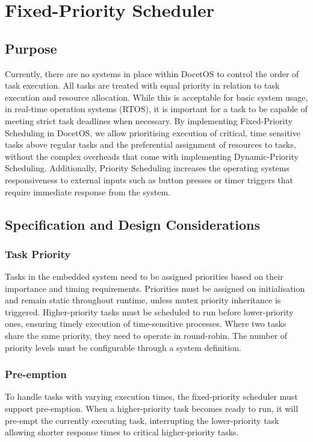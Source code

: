 \section{Fixed-Priority Scheduler}
\subsection{Purpose}
Currently, there are no systems in place within DocetOS to control the order of task execution. All tasks are treated with equal priority in relation to task execution and resource allocation. While this is acceptable for basic system usage, in real-time operation systems (RTOS), it is important for a task to be capable of meeting strict task deadlines when necessary.\hfill\newline
By implementing Fixed-Priority Scheduling in DocetOS, we allow prioritising execution of critical, time sensitive tasks above regular tasks and the preferential assignment of resources to tasks, without the complex overheads that come with implementing Dynamic-Priority Scheduling. Additionally, Priority Scheduling increases the operating systems responsiveness to external inputs such as button presses or timer triggers that require immediate response from the system.

\subsection{Specification and Design Considerations}
\subsubsection{Task Priority}
Tasks in the embedded system need to be assigned priorities based on their importance and timing requirements. Priorities must be assigned on initialisation and remain static throughout runtime, unless mutex priority inheritance is triggered. Higher-priority tasks must be scheduled to run before lower-priority ones, ensuring timely execution of time-sensitive processes. Where two tasks share the same priority, they need to operate in round-robin. The number of priority levels must be configurable through a system definition.

\subsubsection{Pre-emption}
To handle tasks with varying execution times, the fixed-priority scheduler must support pre-emption. When a higher-priority task becomes ready to run, it will pre-empt the currently executing task, interrupting the lower-priority task allowing shorter response times to critical higher-priority tasks.

